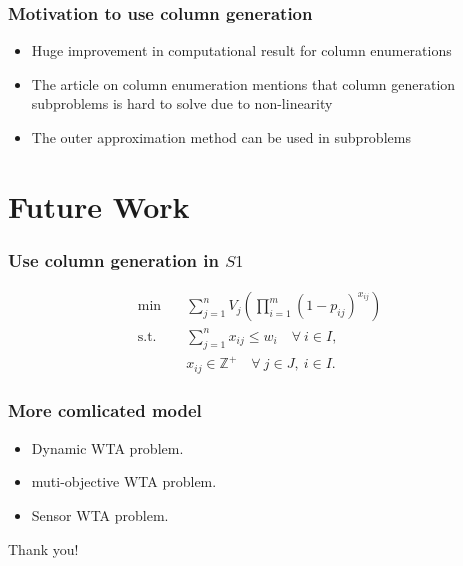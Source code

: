 \documentclass[CJK,10pt]{beamer}
\begin{document}
\begin{frame}
    \frametitle{Motivation to use column generation}
    \begin{itemize}
        \item Huge improvement in computational result for column enumerations
        \item The article on column enumeration mentions that column generation subproblems is hard to solve due to non-linearity
        \item The outer approximation method can be used in subproblems
    \end{itemize}
\end{frame}

\section{Future Work}
\begin{frame}
    \frametitle{Use column generation in $S1$}
    \begin{align*} \tag{S1}
        \min\quad & \sum_{j=1}^n V_j \left( \prod_{i=1}^m (1 -  p_{ij})^{x_{ij}} \right) \\ 
        \mathrm{s. t.}\quad &\sum_{j=1}^n x_{ij} \leq w_i\quad \forall ~i \in I,\\
        & x_{ij} \in \mathbb{Z}^+ \quad \forall~ j\in J , ~ i \in I.
    \end{align*}
\end{frame}

\begin{frame}
    \frametitle{More comlicated model}
    \begin{itemize}
        \item Dynamic WTA problem.
        \item muti-objective WTA problem.
        \item Sensor WTA problem.
    \end{itemize}
\end{frame}

\begin{frame}
\textcolor{myNewColorA}{\Huge{\centerline{Thank you!}}}
\end{frame}
\end{document}
